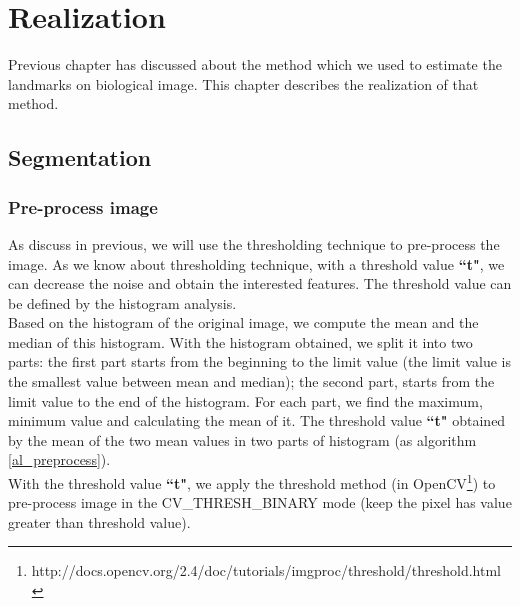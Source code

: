 \chapter{Realization}
Previous chapter has discussed about the method which we used to estimate the landmarks on biological image. This chapter describes the realization of that method.
\section{Segmentation}
\subsection{Pre-process image}
As discuss in previous, we will use the thresholding technique to pre-process the image. As we know about thresholding technique, with a threshold value \textbf{``t"}, we can decrease the noise and obtain the interested features. The threshold value can be defined by the histogram analysis.\\[0.2cm]
Based on the histogram of the original image, we compute the mean and the median of this histogram. With the histogram obtained, we split it into two parts: the first part starts from the beginning to the limit value (the limit value is the smallest value between mean and median); the second part, starts from the limit value to the end of the histogram. For each part, we find the maximum, minimum value and calculating the mean of it. The threshold value \textbf{``t"} obtained by the mean of the two mean values in two parts of histogram (as algorithm \ref{al_preprocess}).\\
With the threshold value \textbf{``t"}, we apply the threshold method (in OpenCV\footnote{http://docs.opencv.org/2.4/doc/tutorials/imgproc/threshold/threshold.html}) to pre-process image in the CV\_THRESH\_BINARY mode (keep the pixel has value greater than threshold value).\\
\IncMargin{1em}
